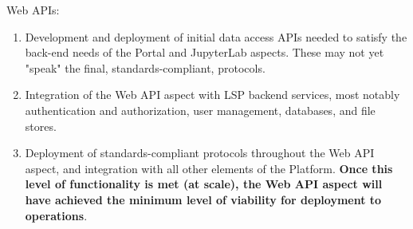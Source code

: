 \documentclass[DM,lsstdraft,toc]{lsstdoc}
\begin{document}
Web APIs:
\begin{enumerate}
	\item Development and deployment of initial data access APIs needed to satisfy the back-end needs of the Portal and JupyterLab aspects. These may not yet "speak" the final, standards-compliant, protocols.
	\item Integration of the Web API aspect with LSP backend services, most notably authentication and authorization, user management, databases, and file stores. 
	\item Deployment of standards-compliant protocols throughout the Web API aspect, and integration with all other elements of the Platform. {\bf Once this level of functionality is met (at scale), the Web API aspect will have achieved the minimum level of viability for deployment to operations}.
\end{enumerate}
\end{document}
